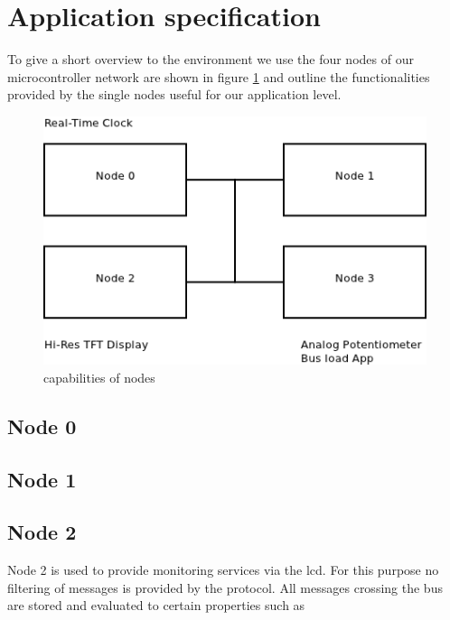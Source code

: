 \section{Application specification}
\label{sec:app:specification}

To give a short overview to the environment we use the four nodes of our microcontroller network are shown in figure \ref{fig:app:specification:node_overview}  
and outline the functionalities provided by the single nodes useful for our application level.\\

\begin{figure}[t]
 \centering
 \includegraphics[scale=0.5]{../images/node_overview.png}
 \caption{capabilities of nodes}
 \label{fig:app:specification:node_overview}
\end{figure}

\subsection{Node 0}
\label{sec:app:specification:node0}

\subsection{Node 1}
\label{sec:app:specification:node1}

\subsection{Node 2}
\label{sec:app:specification:node2}

Node 2 is used to provide monitoring services via the lcd. For this purpose no filtering of messages is provided by the protocol.
All messages crossing the bus are stored and evaluated to certain properties such as


